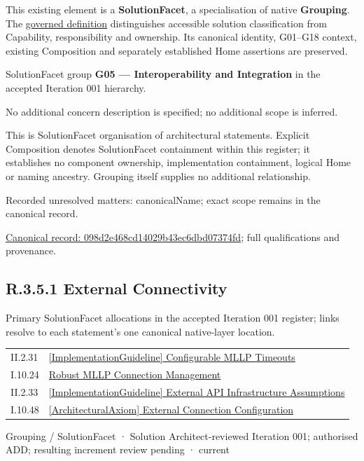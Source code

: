 This existing element is a \textbf{SolutionFacet}, a specialisation of native
\textbf{Grouping}. The \href{\detokenize{../../../../../../../governance/continuum-representation.md#solutionfacet-classification--1119-candidate}}{governed definition}
distinguishes accessible solution classification from Capability, responsibility
and ownership. Its canonical identity, G01–G18 context, existing Composition
and separately established Home assertions are preserved.



SolutionFacet group \textbf{G05 — Interoperability and Integration} in the accepted Iteration 001 hierarchy.



No additional concern description is specified; no additional scope is inferred.



This is SolutionFacet organisation of architectural statements. Explicit Composition denotes SolutionFacet containment within this register; it establishes no component ownership, implementation containment, logical Home or naming ancestry. Grouping itself supplies no additional relationship.


{\small Recorded unresolved matters: canonicalName; exact scope remains in the canonical record.}\par
{\footnotesize \href{../../../../../../../continuum/grouping/098d2e468cd14029b43ec6dbd07374fd.md}{Canonical record: 098d2e468cd14029b43ec6dbd07374fd}; full qualifications and provenance.}\par
\subsection*{R.3.5.1 External Connectivity}
\label{navigation:R.3.5.1}

Primary SolutionFacet allocations in the accepted Iteration 001 register; links resolve to each statement’s one canonical native-layer location.\par
\begin{longtable}{p{.22\linewidth}p{.73\linewidth}}
II.2.31 & \hyperref[element:267142b7a01a49c686458b9fc1c8d7b2]{[ImplementationGuideline] Configurable MLLP Timeouts} \\
I.10.24 & \hyperref[element:e7b7d94a94194ef28a12051a550d3f3f]{Robust MLLP Connection Management} \\
II.2.33 & \hyperref[element:a0c7aa62c0ff498c91dcd6af011170ce]{[ImplementationGuideline] External API Infrastructure Assumptions} \\
I.10.48 & \hyperref[element:f24e63c49135411bbfbc06f9385aeea5]{[ArchitecturalAxiom] External Connection Configuration} \\
\end{longtable}
\label{element:0b9e18356e9e4dcca51007f03f7b81b4}
{\small Grouping / SolutionFacet · Solution Architect-reviewed Iteration 001; authorised ADD; resulting increment review pending · current}\par

